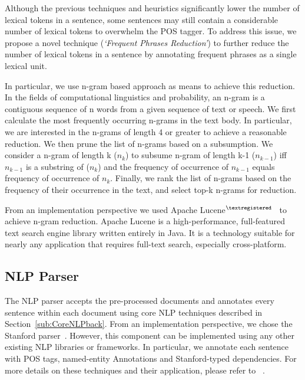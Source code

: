 Although the previous techniques and heuristics significantly lower the number of lexical tokens in a sentence, some sentences may still contain a considerable number of lexical tokens to overwhelm the POS tagger.
To address this issue, we propose a novel technique (\textit{`Frequent Phrases Reduction'}) to further reduce the number of lexical tokens in a sentence by annotating frequent phrases as a single lexical unit.

In particular, we use n-gram based approach as means to achieve this reduction. 
In the fields of computational linguistics and probability, an n-gram is a contiguous sequence of n words from a given sequence of text or speech. 
We first calculate the most frequently occurring n-grams in the text body. 
In particular, we are interested in the n-grams of length 4 or greater to achieve a reasonable reduction. 
We then prune the list of n-grams based on a subsumption. 
We consider a n-gram of length k ($n_k$) to subsume n-gram of length k-1 ($n_{k-1}$) iff $n_{k-1}$ is a substring of ($n_k$) and the frequency of occurrence of $n_{k-1}$ equals frequency of occurrence of $n_{k}$.
Finally, we rank the list of n-grams based on the frequency of their occurrence in the text, and select top-k n-grams for reduction.
 
From an implementation perspective we used Apache Lucene$^{\textregistered}$~\cite{lucene} to achieve n-gram reduction.
Apache Lucene is a high-performance, full-featured text search engine library written entirely in Java.
It is a technology suitable for nearly any application that requires full-text search, especially cross-platform.

	
\subsection{NLP Parser}


The NLP parser accepts the pre-processed documents and annotates every sentence within each document using core NLP techniques described in Section~\ref{sub:CoreNLPback}.
From an implementation perspective, we chose the Stanford parser~\cite{SNLP}.
However, this component can be implemented using any other existing NLP libraries or frameworks.
In particular, we annotate each sentence with POS tags, named-entity Annotations and Stanford-typed dependencies.
For more details on these techniques and their application, please refer to ~\cite{Marneffe06LREC, Marneffe08COLING, pandita12:inferring, pandita13:WHYPER, thummalapentaICSE12}.

